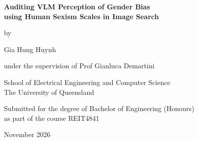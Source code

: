 \begin{titlepage}
\centering
\vspace*{2cm}
{\LARGE\bfseries Auditing VLM Perception of Gender Bias\\[4pt]
 using Human Sexism Scales in Image Search\par}
\vspace{2cm}
{\large by\par}
\vspace{0.5cm}
{\Large Gia Hung Huynh\par}
\vspace{0.5cm}
{\large under the supervision of Prof Gianluca Demartini\par}
\vfill
{\large School of Electrical Engineering and Computer Science\\
The University of Queensland\par}
\vspace{1cm}
{\normalsize Submitted for the degree of
 Bachelor of Engineering (Honours)\\
 as part of the course REIT4841\par}
\vspace{1cm}
{\normalsize November 2026\par}
\end{titlepage}
